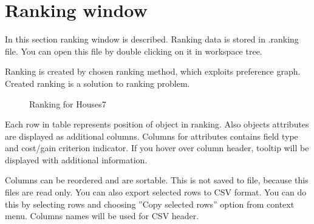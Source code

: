\section{Ranking window}\label{section:ranking}

In this section ranking window is described. Ranking data is stored in .ranking file. You can open this file by double clicking on it in workspace tree.

Ranking is created by chosen ranking method, which exploits preference graph. Created ranking is a solution to ranking problem.

\begin{figure*}[!ht] 
	\centering
	\caption{Ranking for Houses7}
\end{figure*}

Each row in table represents position of object in ranking. Also objects attributes are displayed as additional columns. Columns for attributes contains field type and cost/gain criterion indicator. If you hover over column header, tooltip will be displayed with additional information.

Columns can be reordered and are sortable. This is not saved to file, because this files are read only. You can also export selected rows to CSV format. You can do this by selecting rows and choosing ''Copy selected rows'' option from context menu. Columns names will be used for CSV header.

\vfill\newpage